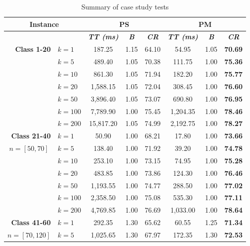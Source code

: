 \begin{table}[htbp]
    \centering
    \caption{Summary of case study tests}
    \begin{tabular}{|l|l|c|c|c|c|c|c|}
    \hline
    \multicolumn{ 2}{|c|}{\textbf{Instance}} & \multicolumn{ 3}{c|}{\textbf{PS}} & \multicolumn{ 3}{c|}{\textbf{PM}} \\ \hline
    \multicolumn{ 2}{|l|}{} & \textbf{\textit{TT (ms)}} & \textbf{\textit{B}} & \textbf{\textit{CR}} & \textbf{\textit{TT (ms)}} & \textbf{\textit{B}} & \textbf{\textit{CR}} \\ \hline
    \multicolumn{1}{|r|}{\textbf{Class 1-20}} & $k=1$ & 187.25 & 1.15 & 64.10 & 54.95 & 1.05 & \textbf{70.69} \\ 
     & $k=5$ & 489.40 & 1.05 & 70.38 & 111.75 & 1.00 & \textbf{75.36} \\ 
     & $k=10$ & 861.30 & 1.05 & 71.94 & 182.20 & 1.00 & \textbf{75.77} \\ 
     & $k=20$ & 1,588.15 & 1.05 & 72.04 & 308.45 & 1.00 & \textbf{76.60} \\ 
     & $k=50$ & 3,896.40 & 1.05 & 73.07 & 690.80 & 1.00 & \textbf{76.95} \\ 
     & $k=100$ & 7,789.90 & 1.00 & 75.45 & 1,204.35 & 1.00 & \textbf{78.46} \\ 
     & $k=200$ & 15,817.20 & 1.05 & 74.99 & 2,192.75 & 1.00 & \textbf{78.27} \\ \hline
    \multicolumn{1}{|r|}{\textbf{Class 21-40}} & $k=1$ & 50.90 & 1.00 & 68.21 & 17.80 & 1.00 & \textbf{73.66} \\ 
    \multicolumn{1}{|c|}{$n = [50, 70]$} & $k=5$ & 138.40 & 1.00 & 71.92 & 39.20 & 1.00 & \textbf{74.78} \\ 
     & $k=10$ & 253.10 & 1.00 & 73.15 & 74.95 & 1.00 & \textbf{75.28} \\ 
     & $k=20$ & 483.85 & 1.00 & 73.86 & 124.30 & 1.00 & \textbf{76.46} \\ 
     & $k=50$ & 1,193.55 & 1.00 & 74.77 & 288.50 & 1.00 & \textbf{77.02} \\ 
     & $k=100$ & 2,358.50 & 1.00 & 75.08 & 535.30 & 1.00 & \textbf{77.11} \\ 
     & $k=200$ & 4,769.85 & 1.00 & 76.69 & 1,033.00 & 1.00 & \textbf{78.64} \\ \hline
    \multicolumn{1}{|r|}{\textbf{Class 41-60}} & $k=1$ & 292.35 & 1.30 & 65.62 & 60.55 & 1.25 & \textbf{71.34} \\ 
    \multicolumn{1}{|c|}{$n = [70, 120]$} & $k=5$ & 1,025.65 & 1.30 & 67.97 & 172.35 & 1.30 & \textbf{72.53} \\ 

\end{tabular}
\end{table}
